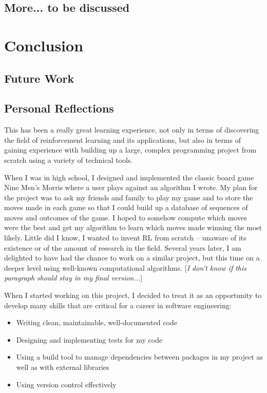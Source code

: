\documentclass[11pt,a4paper]{report}
\begin{document}
\section{More... to be discussed}


\chapter{Conclusion}


\section{Future Work}


\section{Personal Reflections}

This has been a really great learning experience, not only in terms of discovering the field of reinforcement learning and its applications, but also in terms of gaining experience with building up a large, complex programming project from scratch using a variety of technical tools.

When I was in high school, I designed and implemented the classic board game Nine Men’s Morris where a user plays against an algorithm I wrote. My plan for the project was to ask my friends and family to play my game and to store the moves made in each game so that I could build up a database of sequences of moves and outcomes of the game. I hoped to somehow compute which moves were the best and get my algorithm to learn which moves made winning the most likely. Little did I know, I wanted to invent RL from scratch – unaware of its existence or of the amount of research in the field. Several years later, I am delighted to have had the chance to work on a similar project, but this time on a deeper level using well-known computational algorithms. [\emph{I don't know if this paragraph should stay in my final version...}]

When I started working on this project, I decided to treat it as an opportunity to develop many skills that are critical for a career in software engineering:

\begin{itemize}
	\item Writing clean, maintainable, well-documented code
	\item Designing and implementing tests for my code
	\item Using a build tool to manage dependencies between packages in my project as well as with external libraries
	\item Using version control effectively
\end{itemize}
\end{document}
